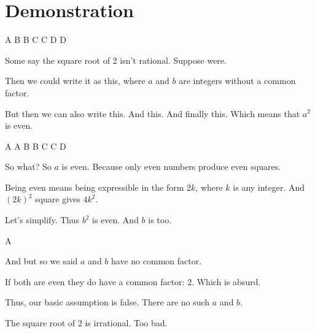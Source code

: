 %
\titleslide

\Title
\Subtitle
{}\Date

\endtitleslide





\section{Demonstration}


 A B
 B C
 C D
 D {}

\step Some say the square root of 2 isn't rational.
\step Suppose
 were.

\step[A] Then we could write it as this, where $a$ and $b$ are
integers without a common factor.

\step[B] But then we can also write this.
\step[C] And this.
\step[D] And finally this.
\step Which means that $a^2$ is even.

\endslide




   A
 A B
 B C
 C D

\step[visible="true"] So what?
\step So $a$ is even. Because only even numbers produce even squares.

\step[A] Being even means being expressible in the form $2k$, where $k$ is
any integer.
\step[B] And $(2k)^2$ square gives $4k^2$.

\step[C] Let's simplify.
\step Thus $b^2$ is even.
\step And $b$ is too.

\endslide




 A {}

\step[visible=true] And but so we said $a$ and $b$ have no common factor.

\step If both are even they do have a common factor: 2.
\step Which is absurd.

\step Thus, our basic assumption is false.
\step[A] There are no such $a$ and $b$.

\step The square root of 2 is irrational.
\step Too bad.

\endslide





